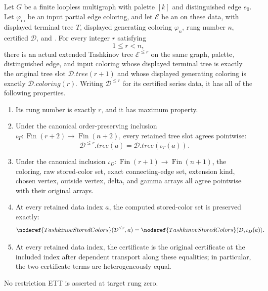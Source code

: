 \begin{lemma}
Let $G$ be a finite loopless multigraph with palette $[k]$ and
distinguished edge $e_0$.  Let $\varphi_{\mathrm{in}}$ be an input
partial edge coloring, and let $\mathcal E$ be an
 on these data, with displayed terminal
tree $T$, displayed generating coloring $\varphi_n$, rung number $n$,
certified  $\mathcal D$, and
.
For every integer $r$ satisfying
\[
                         1\leq r<n,
\]
there is an actual extended Tashkinov tree $\mathcal E^{\leq r}$ on the
same graph, palette, distinguished edge, and input coloring whose
displayed terminal tree is exactly the original tree slot
$\mathcal D.\mathit{tree}(r+1)$ and whose displayed generating coloring
is exactly $\mathcal D.\mathit{coloring}(r)$.  Writing
$\mathcal D^{\leq r}$ for its certified series data, it has all of the
following properties.
\begin{enumerate}
\item Its rung number is exactly $r$, and it has maximum property.
\item Under the canonical order-preserving inclusion
$\iota_T:\operatorname{Fin}(r+2)\to\operatorname{Fin}(n+2)$, every
retained tree slot agrees pointwise:
\[
 \mathcal D^{\leq r}.\mathit{tree}(a)
   =\mathcal D.\mathit{tree}(\iota_T(a)).
\]
\item Under the canonical inclusion
$\iota_D:\operatorname{Fin}(r+1)\to\operatorname{Fin}(n+1)$, the
coloring, raw stored-color set, exact connecting-edge set, extension
kind, chosen vertex, outside vertex, delta, and gamma arrays all agree
pointwise with their original arrays.
\item At every retained data index $a$, the computed stored-color set is
preserved exactly:
\[
 \noderef{TashkinovStoredColors}(\mathcal D^{\leq r},a)
  =\noderef{TashkinovStoredColors}(\mathcal D,\iota_D(a)).
\]
\item At every retained data index, the
 certificate is the original certificate at
the included index after dependent transport along these equalities; in
particular, the two certificate terms are heterogeneously equal.
\end{enumerate}
No restriction ETT is asserted at target rung zero.
\end{lemma}
